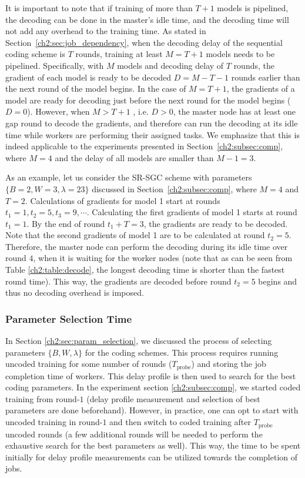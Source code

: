 It is important to note that if training of more than $T+1$ models is pipelined, the decoding can be done in the master's idle time, and the decoding time will not add any overhead to the training time. As stated in Section~\ref{ch2:sec:job_dependency}, when the decoding delay of the sequential coding scheme is $T$ rounds, training at least $M = T+1$ models needs to be pipelined.
Specifically, with $M$ models and decoding delay of $T$ rounds, the gradient of each model is ready to be decoded $D = M-T-1$ rounds earlier than the next round of the model begins. In the case of $M=T+1$, the gradients of a model are ready for decoding just before the next round for the model begins ($D=0$). However, when $M > T + 1$ , i.e. $D > 0$, the master node has at least one gap round to decode the gradients, and therefore can run the decoding at its idle time while workers are performing their assigned tasks. We emphasize that this is indeed applicable to the experiments presented in Section~\ref{ch2:subsec:comp}, where $M=4$ and the delay of all models are smaller than $M-1=3$.

As an example, let us consider the SR-SGC scheme with parameters $\{B=2, W=3, \lambda=23\}$ discussed in Section~\ref{ch2:subsec:comp}, where $M=4$ and $T=2$. Calculations of gradients for model 1 start at rounds $t_1=1, t_2=5, t_3=9, \cdots$. Calculating the first gradients of model 1 starts at round $t_1=1$. By the end of round $t_1+T=3$, the gradients are ready to be decoded. Note that the second gradients of model 1 are to be calculated at round $t_2=5$. Therefore, the master node can perform the decoding during its idle time over round $4$, when it is waiting for the worker nodes (note that as can be seen from Table \ref{ch2:table:decode}, the longest decoding time is shorter than the fastest round time). This way, the gradients are decoded before round $t_2=5$ begins and thus no decoding overhead is imposed.

\subsubsection{Parameter Selection Time}

In Section \ref{ch2:sec:param_selection}, we discussed the process of selecting parameters $\{B, W, \lambda\}$ for the coding schemes. This process requires running uncoded training for some number of rounds ($T_\text{probe}$) and storing the job completion time of workers. This delay profile is then used to search for the best coding parameters. In the experiment section \ref{ch2:subsec:comp}, we started coded training from round-$1$  (delay profile measurement and selection of best parameters are done beforehand). However, in practice, one can opt to start with uncoded training in round-$1$ and then switch to coded training after  $T_\text{probe}$ uncoded rounds (a few additional rounds will be needed to perform the exhaustive search for the best parameters as well). This way, the time to be spent initially for delay profile measurements can be utilized towards the completion of jobs.


